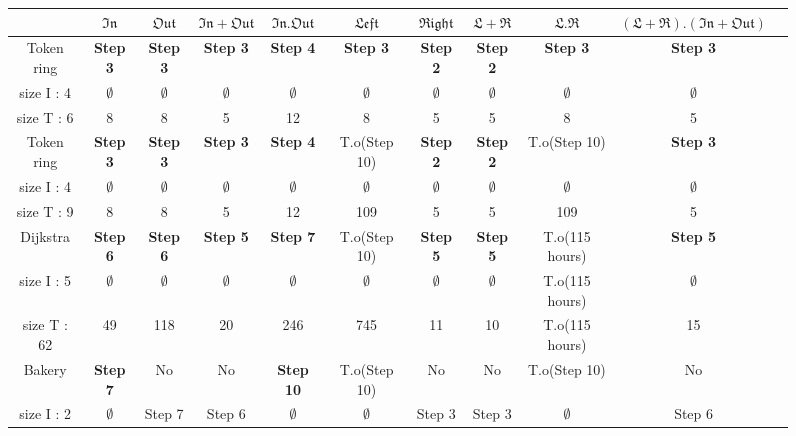 \documentclass[]{llncs}
\begin{document}
\begin{figure}[tb]
\begin{bigcenter}
\begin{scriptsize}
\begin{tabular}{|c|c|c|c|c|c|c|c|c|c|c|}
\hline
			&	$\mathfrak{In}$		&	$\mathfrak{Out}$		&	$\mathfrak{In+Out}$		&	$\mathfrak{In.Out}$		&	$\mathfrak{Left}$			&	$\mathfrak{Right}$			&	$\mathfrak{L+R}$			&	$\mathfrak{L.R}$			&	$\mathfrak{(L+R).(In+Out)}$	\\
\hline
Token ring		&	\textbf{Step 3}			&	\textbf{Step 3}			&	\textbf{Step 3}			&	\textbf{Step 4}			&	\textbf{Step 3}	&	\textbf{Step 2}	&	\textbf{Step 2}	&	\textbf{Step 3}	&	\textbf{Step 3}	\\
size I : 4		&	$\mathbf{\emptyset}$	&	$\mathbf{\emptyset}$	&	$\mathbf{\emptyset}$	& 	$\mathbf{\emptyset}$	&	$\mathbf{\emptyset}$		&	$\mathbf{\emptyset}$		&	$\mathbf{\emptyset}$		&	$\mathbf{\emptyset}$		&	$\mathbf{\emptyset}$		\\
size T : 6		&	8					&	8					&	5					&	12					&	8				&	5				&	5				&	8				&	5				\\
\hline
Token ring		&	\textbf{Step 3}			&	\textbf{Step 3}			&	\textbf{Step 3}			&	\textbf{Step 4}			&	T.o(Step 10)		&	\textbf{Step 2}	&	\textbf{Step 2}	&	T.o(Step 10)		&	\textbf{Step 3}	\\
size I : 4		&	$\mathbf{\emptyset}$	&	$\mathbf{\emptyset}$	&	$\mathbf{\emptyset}$	& 	$\mathbf{\emptyset}$	&	$\emptyset$				&	$\mathbf{\emptyset}$		&	$\mathbf{\emptyset}$		&	$\emptyset$				&	$\mathbf{\emptyset}$		\\
size T : 9		&	8					&	8					&	5					&	12					&	109				&	5				&	5				&	109				&	5				\\
\hline
Dijkstra		&	\textbf{Step 6}			&	\textbf{Step 6}			&	\textbf{Step 5}			&	\textbf{Step 7}			&	T.o(Step 10)		&	\textbf{Step 5}	&	\textbf{Step 5}	&	T.o(115 hours)		&	\textbf{Step 5}	\\
size I : 5		&	$\mathbf{\emptyset}$	&	$\mathbf{\emptyset}$	&	$\mathbf{\emptyset}$	&	$\mathbf{\emptyset}$	&	$\emptyset$				&	$\mathbf{\emptyset}$		&	$\mathbf{\emptyset}$		&	T.o(115 hours)		&	$\mathbf{\emptyset}$		\\	
size T : 62		&	49					&	118					&	20					&	246					&	745				&	11				&	10				&	T.o(115 hours)		&	15				\\	
\hline
Bakery		&	\textbf{Step 7}			&	No					&	No					&	\textbf{Step 10}			&	T.o(Step 10)		&	No				&	No				&	T.o(Step 10)		&	No				\\
size I : 2		&	$\mathbf{\emptyset}$	&	Step 7				&	Step 6				&	$\mathbf{\emptyset}$	&	$\emptyset$				&	Step 3			&	Step 3			&	$\emptyset$				&	Step 6			\\

\end{tabular}
\end{scriptsize}
\end{bigcenter}
\end{figure}
\end{document}

